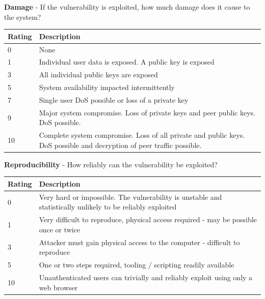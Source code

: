 \documentclass [11pt, proquest] {uwthesis}[2020/02/24]
\begin{document}
\begin{table}[H] 
\label{dread:dmg}
\raggedright
\textbf{Damage} - If the vulnerability is exploited, how much damage does it cause to the system?
\begin{tabular}{|m{1.5cm}|p{15cm} |}
\hline
Rating & Description \\
\hline
0 &  None            \\
\hline
1 &  Individual user data is exposed. A public key is exposed \\
\hline
3 &  All individual public keys are exposed         \\
\hline
5 &  System availability impacted intermittently          \\
\hline
7 &  Single user DoS possible or loss of a private key  \\
\hline
9 &  Major system compromise. Loss of private keys and peer public keys. DoS possible. \\
\hline
10 & Complete system compromise. Loss of all private and public keys. DoS possible and decryption of peer traffic possible.\\
\hline
\end{tabular}
\end{table}

\begin{table}[H]
\label{dread:repro}
\raggedright
\textbf{Reproducibility} - How reliably can the vulnerability be exploited?
\begin{tabular}{|m{1.5cm}|p{15cm} |}
\hline
Rating & Description \\
\hline
0 &  Very hard or impossible. The vulnerability is unstable and statistically unlikely to be reliably exploited \\
\hline
1 &  Very difficult to reproduce, physical access required  - may be possible once or twice  \\
\hline
3 &  Attacker must gain physical access to the computer - difficult to reproduce \\
\hline
5 &  One or two steps required, tooling / scripting readily available       \\
\hline
10 & Unauthenticated users can trivially and reliably exploit using only a web browser \\
\hline
\end{tabular}
\end{table}
\end{document}
